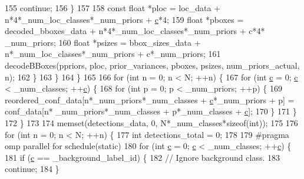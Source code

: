 \begin{DoxyCode}
155                         \textcolor{keywordflow}{continue};
156                     \}
157 
158                     \textcolor{keyword}{const} \textcolor{keywordtype}{float} *ploc = loc\_data + n*4*\_num\_loc\_classes*\_num\_priors + 
      \hyperlink{CMakeCache_8txt_aac1d6a1710812201527c735f7c6afbaa}{c}*4;
159                     \textcolor{keywordtype}{float} *pboxes = decoded\_bboxes\_data + n*4*\_num\_loc\_classes*\_num\_priors + c*4*
      \_num\_priors;
160                     \textcolor{keywordtype}{float} *psizes = bbox\_sizes\_data + n*\_num\_loc\_classes*\_num\_priors + c*\_num\_priors;
161                     decodeBBoxes(ppriors, ploc, prior\_variances, pboxes, psizes, num\_priors\_actual, n);
162                 \}
163             \}
164         \}
165 
166         \textcolor{keywordflow}{for} (\textcolor{keywordtype}{int} n = 0; n < N; ++n) \{
167             \textcolor{keywordflow}{for} (\textcolor{keywordtype}{int} \hyperlink{CMakeCache_8txt_aac1d6a1710812201527c735f7c6afbaa}{c} = 0; \hyperlink{CMakeCache_8txt_aac1d6a1710812201527c735f7c6afbaa}{c} < \_num\_classes; ++\hyperlink{CMakeCache_8txt_aac1d6a1710812201527c735f7c6afbaa}{c}) \{
168                 \textcolor{keywordflow}{for} (\textcolor{keywordtype}{int} p = 0; p < \_num\_priors; ++p) \{
169                     reordered\_conf\_data[n*\_num\_priors*\_num\_classes + \hyperlink{CMakeCache_8txt_aac1d6a1710812201527c735f7c6afbaa}{c}*\_num\_priors + p] = conf\_data[n*
      \_num\_priors*\_num\_classes + p*\_num\_classes + \hyperlink{CMakeCache_8txt_aac1d6a1710812201527c735f7c6afbaa}{c}];
170                 \}
171             \}
172         \}
173 
174         memset(detections\_data, 0, N*\_num\_classes*\textcolor{keyword}{sizeof}(\textcolor{keywordtype}{int}));
175 
176         \textcolor{keywordflow}{for} (\textcolor{keywordtype}{int} n = 0; n < N; ++n) \{
177             \textcolor{keywordtype}{int} detections\_total = 0;
178 
179 \textcolor{preprocessor}{#pragma omp parallel for schedule(static)}
180             \textcolor{keywordflow}{for} (\textcolor{keywordtype}{int} \hyperlink{CMakeCache_8txt_aac1d6a1710812201527c735f7c6afbaa}{c} = 0; \hyperlink{CMakeCache_8txt_aac1d6a1710812201527c735f7c6afbaa}{c} < \_num\_classes; ++\hyperlink{CMakeCache_8txt_aac1d6a1710812201527c735f7c6afbaa}{c}) \{
181                 \textcolor{keywordflow}{if} (\hyperlink{CMakeCache_8txt_aac1d6a1710812201527c735f7c6afbaa}{c} == \_background\_label\_id) \{
182                     \textcolor{comment}{// Ignore background class.}
183                     \textcolor{keywordflow}{continue};
184                 \}

\end{DoxyCode}
